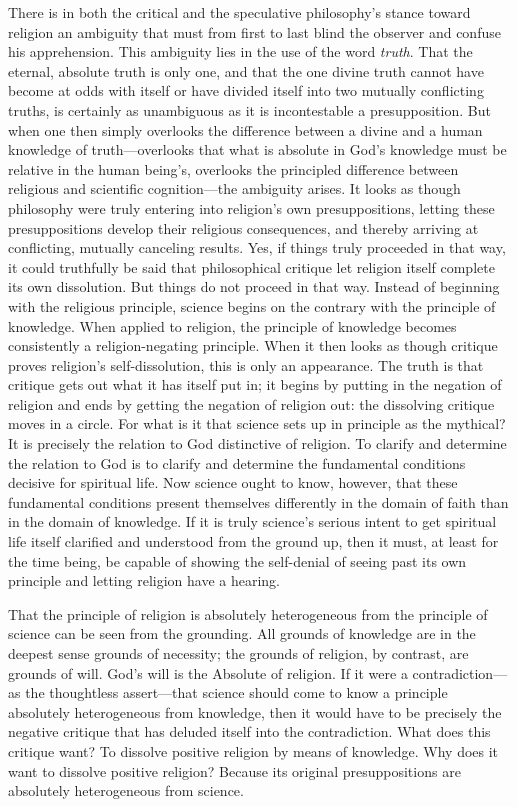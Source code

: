 \documentclass[12pt,a4paper]{article}
\begin{document}
There is in both the critical and the speculative philosophy's
stance toward religion an ambiguity that must from first to last
blind the observer and confuse his apprehension. This ambiguity
lies in the use of the word \emph{truth}. That the eternal,
absolute truth is only one, and that the one divine truth cannot
have become at odds with itself or have divided itself into two
mutually conflicting truths, is certainly as unambiguous as it
is incontestable a presupposition. But when one then simply
overlooks the difference between a divine and a human knowledge
of truth---overlooks that what is absolute in God's knowledge
must be relative in the human being's, overlooks the principled
difference between religious and scientific cognition---the
ambiguity arises. It looks as though philosophy were truly
entering into religion's own presuppositions, letting these
presuppositions develop their religious consequences, and thereby
arriving at conflicting, mutually canceling results. Yes, if
things truly proceeded in that way, it could truthfully be said
that philosophical critique let religion itself complete its own
dissolution. But things do not proceed in that way. Instead of
beginning with the religious principle, science begins on the
contrary with the principle of knowledge. When applied to
religion, the principle of knowledge becomes consistently a
religion-negating principle. When it then looks as though
critique proves religion's self-dissolution, this is only an
appearance. The truth is that critique gets out what it has
itself put in; it begins by putting in the negation of religion
and ends by getting the negation of religion out: the dissolving
critique moves in a circle. For what is it that science sets up
in principle as the mythical? It is precisely the relation to
God distinctive of religion. To clarify and determine the
relation to God is to clarify and determine the fundamental
conditions decisive for spiritual life. Now science ought to
know, however, that these fundamental conditions present
themselves differently in the domain of faith than in the
domain of knowledge. If it is truly science's serious intent to
get spiritual life itself clarified and understood from the
ground up, then it must, at least for the time being, be capable
of showing the self-denial of seeing past its own principle and
letting religion have a hearing.

That the principle of religion is absolutely heterogeneous from
the principle of science can be seen from the grounding. All
grounds of knowledge are in the deepest sense grounds of
necessity; the grounds of religion, by contrast, are grounds of
will. God's will is the Absolute of religion. If it were a
contradiction---as the thoughtless assert---that science should
come to know a principle absolutely heterogeneous from knowledge,
then it would have to be precisely the negative critique that has
deluded itself into the contradiction. What does this critique
want? To dissolve positive religion by means of knowledge. Why
does it want to dissolve positive religion? Because its original
presuppositions are absolutely heterogeneous from science.
\end{document}
